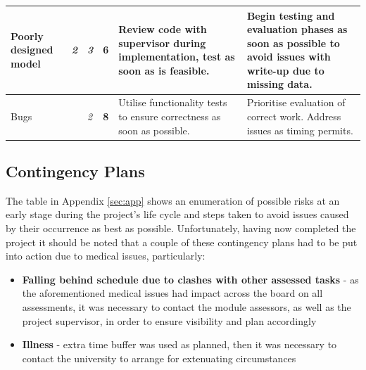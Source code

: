 \documentclass[12pt]{article}
\begin{document}
\begin{table}[h!]
\begin{tabular}{|>{\centering}m{1.5in} |>{\centering}m{0.1in} |>{\centering}m{0.1in} |>{\centering}m{0.3in} |>{\centering}m{1.8in} |>{\centering\arraybackslash}m{1.8in}|}
			Poorly designed model                                          & \cellcolor[HTML]{F8FF00}\textit{2}                        & \cellcolor[HTML]{FFC702}\textit{3}                        & \cellcolor[HTML]{FFC702}\textbf{6}  & Review code with supervisor during implementation, test as soon as is feasible.                                      & Begin testing and evaluation phases as soon as possible to avoid issues with write-up due to missing data.    \\ \hline
			Bugs                                                           & \cellcolor[HTML]{F88602}{\color[HTML]{333333} \textit{4}} & \cellcolor[HTML]{F8FF00}\textit{2}                        & \cellcolor[HTML]{FFC702}\textbf{8}  & Utilise functionality tests to ensure correctness as soon as possible.                                               & Prioritise evaluation of correct work. Address issues as timing permits.                                      \\ \hline	
		\end{tabular}
	\end{table}
	
	\subsection{Contingency Plans}
	
	The table in Appendix \ref{sec:app} shows an enumeration of possible risks at an early stage during the project's life cycle and steps taken to avoid issues caused by their occurrence as best as possible. Unfortunately, having now completed the project it should be noted that a couple of these contingency plans had to be put into action due to medical issues, particularly:
	
	\begin{itemize}
		\item \textbf{Falling behind schedule due to clashes with other assessed tasks} - as the aforementioned medical issues had impact across the board on all assessments, it was necessary to contact the module assessors, as well as the project supervisor, in order to ensure visibility and plan accordingly
		\item \textbf{Illness} - extra time buffer was used as planned, then it was necessary to contact the university to arrange for extenuating circumstances
	\end{itemize}
	
\end{document}
